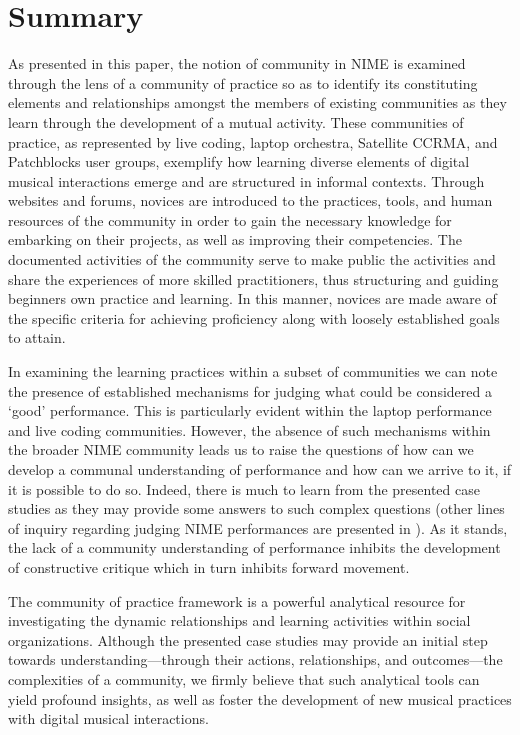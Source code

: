 \section{Summary}
As presented in this paper, the notion of community in NIME is examined through the lens of a community of practice so as to identify its constituting elements and relationships amongst the members of existing communities as they learn through the development of a mutual activity. These communities of practice, as represented by live coding, laptop orchestra, Satellite CCRMA, and Patchblocks user groups, exemplify how learning diverse elements of digital musical interactions emerge and are structured in informal contexts. Through websites and forums, novices are introduced to the practices, tools, and human resources of the community in order to gain the necessary knowledge for embarking on their projects, as well as improving their competencies. The documented activities of the community serve to make public the activities and share the experiences of more skilled practitioners, thus structuring and guiding beginners own practice and learning. In this manner, novices are made aware of the specific criteria for achieving proficiency along with loosely established goals to attain. 

In examining the learning practices within a subset of communities we can note the presence of established mechanisms for judging what could be considered a `good' performance. This is particularly evident within the laptop performance and live coding communities. However, the absence of such mechanisms within the broader NIME community leads us to raise the questions of how can we develop a communal understanding of performance and how can we arrive to it, if it is possible to do so. Indeed, there is much to learn from the presented case studies as they may provide some answers to such complex questions (other lines of inquiry regarding judging NIME performances are presented in \cite{Gurevich:2009}). As it stands, the lack of a community understanding of performance inhibits the development of constructive critique which in turn inhibits forward movement.  

The community of practice framework is a powerful analytical resource for investigating the dynamic relationships and learning activities within social organizations. Although the presented case studies may provide an initial step towards understanding---through their actions, relationships, and outcomes---the complexities of a community, we firmly believe that such analytical tools can yield profound insights, as well as foster the development of new musical practices with digital musical interactions.


